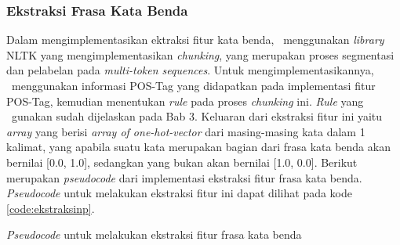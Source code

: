 \subsubsection{Ekstraksi Frasa Kata Benda}
Dalam mengimplementasikan ektraksi fitur kata benda, \saya~menggunakan \textit{library} NLTK \citep{bird2009nltk} yang mengimplementasikan \textit{chunking}, yang merupakan proses segmentasi dan pelabelan pada \textit{multi-token sequences}. Untuk mengimplementasikannya, \saya~menggunakan informasi POS-Tag yang didapatkan pada implementasi fitur POS-Tag, kemudian menentukan \textit{rule} pada proses \textit{chunking} ini. \textit{Rule} yang \saya~gunakan sudah dijelaskan pada Bab 3. Keluaran dari ekstraksi fitur ini yaitu \textit{array} yang berisi \textit{array of one-hot-vector} dari masing-masing kata dalam 1 kalimat, yang apabila suatu kata merupakan bagian dari frasa kata benda akan bernilai [0.0, 1.0], sedangkan yang bukan akan bernilai [1.0, 0.0]. Berikut merupakan \textit{pseudocode} dari implementasi ekstraksi fitur frasa kata benda. \textit{Pseudocode} untuk melakukan ekstraksi fitur ini dapat dilihat pada kode \ref{code:ekstraksinp}.

\begin{kode}

	
	\SetAlgoLined
	\BlankLine
	
	\BlankLine	
	\caption{\textit{Pseudocode} untuk melakukan ekstraksi fitur frasa kata benda}
	\label{code:ekstraksinp}	
\end{kode}

